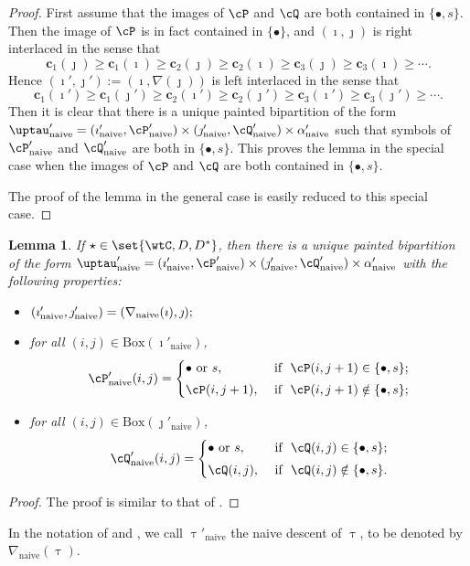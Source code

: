 \documentclass[12pt]{amsart}
\def\DD{\nabla}
\numberwithin{equation}{section}
\newtheorem{lem}[thm]{Lemma}
\theoremstyle{remark}
\def\DD{\nabla}
\def\BOX#1{\mathrm{Box}(#1)}
\def\tnaive{\mathrm{naive}}
\def\cPpn{\cP'_\mathrm{naive}}
\def\cQpn{\cQ'_\mathrm{naive}}
\def\uptaupn{\uptau'_{\tnaive}}
\def\alphapn{\alpha'_{\tnaive}}
\def\imathpn{\imath'_{\tnaive}}
\def\jmathpn{\jmath'_{\tnaive}}
\def\DD{\nabla}
\def\DDn{\nabla_{\tnaive}}
\begin{document}
   \begin{proof}
    First assume that the images of $\cP$ and $\cQ$ are both contained in $\{\bullet, s\}$. Then  the image of $\cP$  is in fact contained in $\{\bullet\}$, and $(\imath, \jmath)$ is  right interlaced in the sense that
 \[
 \mathbf{c}_1(\jmath)\geq \mathbf{c}_1(\imath)\geq \mathbf{c}_2(\jmath)\geq \mathbf{c}_2(\imath)\geq \mathbf{c}_3(\jmath)\geq \mathbf{c}_3(\imath) \geq \cdots.
 \]
 Hence $ (\imath',\jmath'):= (\imath,\DD(\jmath))$ is left interlaced in the sense that
 \[
 \mathbf{c}_1(\imath')\geq \mathbf{c}_1(\jmath')\geq \mathbf{c}_2(\imath')\geq \mathbf{c}_2(\jmath')\geq \mathbf{c}_3(\imath')\geq \mathbf{c}_3(\jmath') \geq \cdots.
 \]
 Then it is clear that there is a unique painted bipartition of the form  $\uptaupn=(\imathpn,\cPpn)\times (\jmathpn,\cQpn)\times \alphapn$ such that symbols of $\cPpn$ and $\cQpn$ are both in $\{\bullet, s\}$. This proves the lemma in the special case when the images of $\cP$ and $\cQ$ are both contained in $\{\bullet, s\}$.

 The proof of the lemma in the general case is easily reduced to this special case.
   \end{proof}
    \begin{lem}\label{lemDDn2}
    If $\star \in \set{ \wtC, D,D^*}$, then there is a unique painted bipartition of the form $\uptaupn= (\imathpn,\cPpn)\times (\jmathpn,\cQpn)\times \alphapn$ with the following properties:
  \begin{itemize}
        \item $
   (\imathpn,\jmathpn)= (\DD_\mathrm{naive}(\imath),\jmath); \smallskip
   $
   \item for all $(i,j)\in \BOX{\imathpn}$,
   \[
     \cPpn(i,j)=\begin{cases}
    \bullet \textrm{ or } s,&\textrm{ if  $\ \cP(i,j+1)\in \{\bullet, s\}$;} \smallskip \\
  \cP(i,j+1),& \textrm{ if $\ \cP(i,j+1)\notin \{\bullet, s\}$};\end{cases}
   \]
   \item for all $(i,j)\in \BOX
          {\jmathpn}$,
   \[
     \cQpn(i,j)=\begin{cases}
    \bullet \textrm{ or } s,&\textrm{ if  $\ \cQ(i,j)\in \{\bullet, s\}$;} \smallskip \\
  \cQ(i,j), & \textrm{ if $\ \cQ(i,j)\notin \{\bullet, s\}$}.  \end{cases}
   \]

    \end{itemize}
\end{lem}
\begin{proof}
  The proof is similar to that of .
\end{proof}
 In the notation of  and , we call $\uptaupn$ the naive descent of $\uptau$, to be denoted by $\DDn(\uptau)$.
\end{document}

